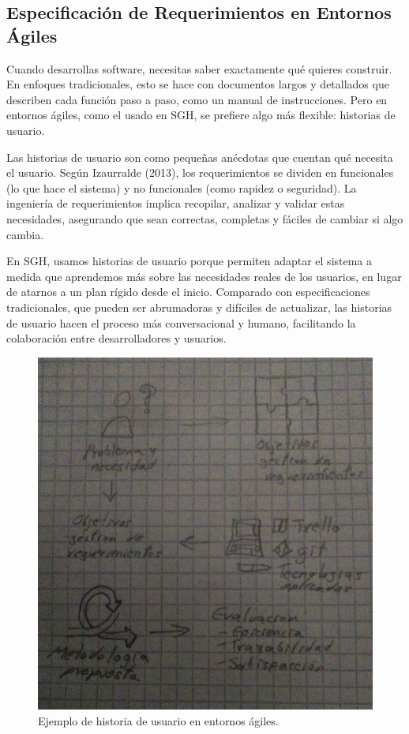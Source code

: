 \subsection{Especificación de Requerimientos en Entornos Ágiles}
Cuando desarrollas software, necesitas saber exactamente qué quieres construir. En enfoques tradicionales, esto se hace con documentos largos y detallados que describen cada función paso a paso, como un manual de instrucciones. Pero en entornos ágiles, como el usado en SGH, se prefiere algo más flexible: historias de usuario.

Las historias de usuario son como pequeñas anécdotas que cuentan qué necesita el usuario. Según Izaurralde (2013), los requerimientos se dividen en funcionales (lo que hace el sistema) y no funcionales (como rapidez o seguridad). La ingeniería de requerimientos implica recopilar, analizar y validar estas necesidades, asegurando que sean correctas, completas y fáciles de cambiar si algo cambia.

En SGH, usamos historias de usuario porque permiten adaptar el sistema a medida que aprendemos más sobre las necesidades reales de los usuarios, en lugar de atarnos a un plan rígido desde el inicio. Comparado con especificaciones tradicionales, que pueden ser abrumadoras y difíciles de actualizar, las historias de usuario hacen el proceso más conversacional y humano, facilitando la colaboración entre desarrolladores y usuarios.

\begin{figure}[h]
\centering
\includegraphics[width=0.8\columnwidth]{graphics/historia de usuario.png}
\caption{Ejemplo de historia de usuario en entornos ágiles.}
\label{fig:historia_usuario}
\end{figure}

